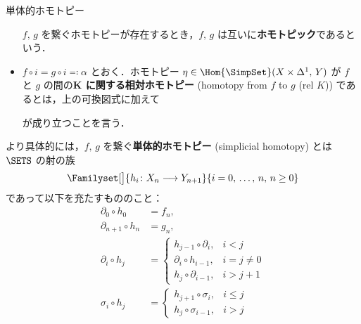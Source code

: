 \documentclass[TQFT_main]{subfiles}
\begin{document}
\begin{mydef}[label=def:SimpSet-homotopic,breakable]{単体的ホモトピー}
\begin{itemize}
\begin{center}
        \end{center}
        $f,\, g$ を繋ぐホモトピーが存在するとき，$f,\, g$ は互いに\textbf{ホモトピック}であるという．
        \item $f \circ i = g \circ i \eqqcolon \alpha$ とおく．ホモトピー $\eta \in \Hom{\SimpSet} (X \times \Delta^1,\, Y)$ が $f$ と $g$ の間の\textbf{$\bm{K}$ に関する相対ホモトピー} (homotopy from $f$ to $g$ (rel $K$)) であるとは，上の可換図式に加えて
        \begin{center}
        \end{center}
        が成り立つことを言う．
    \end{itemize}
    
    \tcblower

    より具体的には，$f,\, g$ を繋ぐ\textbf{単体的ホモトピー} (simplicial homotopy) とは $\SETS$ の射の族
    \begin{align}
        \Familyset[\big]{h_i \colon X_n \lto Y_{n+1}}{i = 0,\, \dots,\, n,\, n \ge 0}
    \end{align}
    であって以下を充たすもののこと：
    \begin{align}
        \partial_0 \circ h_0 &= f_n, \\
        \partial_{n+1} \circ h_n &= g_n, \\
        \partial_i \circ h_j &=
        \begin{cases}
            h_{j-1} \circ \partial_{i}, &i < j \\
            \partial_i \circ h_{i-1}, &i=j \neq 0 \\
            h_j \circ \partial_{i-1}, &i > j+1
        \end{cases} \\
        \sigma_i \circ h_j &=
        \begin{cases}
            h_{j+1} \circ \sigma_i, &i \le j \\
            h_j \circ \sigma_{i-1}, &i > j
        \end{cases}
    \end{align}
\end{mydef}
\end{document}
